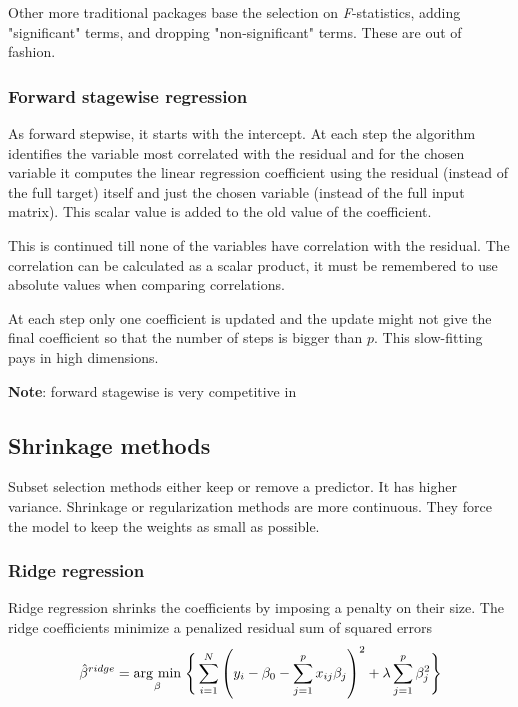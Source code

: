 Other more traditional packages base the selection on \textit{F}-statistics, adding "significant" terms, and dropping "non-significant" terms. These are out of fashion.

\subsubsection{Forward stagewise regression}
As forward stepwise, it starts with the intercept. At each step the algorithm identifies the variable most correlated with the residual and for the chosen variable it computes the linear regression coefficient using the residual (instead of the full target) itself and just the chosen variable (instead of the full input matrix). This scalar value is added to the old value of the coefficient.

This is continued till none of the variables have correlation with the residual. The correlation can be calculated as a scalar product, it must be remembered to use absolute values when comparing correlations.

At each step only one coefficient is updated and the update might not give the final coefficient so that the number of steps is bigger than $p$. This slow-fitting pays in high dimensions.

\textbf{Note}: forward stagewise is very competitive in 

\subsection{Shrinkage methods}
Subset selection methods either keep or remove a predictor. It has higher variance. Shrinkage or regularization methods are more continuous. They force the model to keep the weights as small as possible.


\subsubsection{Ridge regression}
Ridge regression shrinks the coefficients by imposing a penalty on their size.	 The ridge coefficients minimize a penalized residual sum of squared errors
\begin{equation}
\label{bridge}
\hat{\beta}^{ridge} = \underset{\beta}{\operatorname{arg}\,\operatorname{min}}\; \Bigg\lbrace \sum_{i=1}^N \left( y_i -  \beta_0 - \sum_{j=1}^p x_{ij} \beta_j\right)^2+ \lambda \sum_{j=1}^p \beta_j^2 \Bigg\rbrace
\end{equation}

